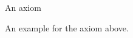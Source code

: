 \documentclass[minimal]{omdoc}
\begin{document}
\begin{module}[name=foo]
    \begin{axiom}[id=ax.one,title=A title]
      An axiom
    \end{axiom}

  \begin{example}[for=ax.one,title=A title]
    An example for the axiom above.
  \end{example}
\end{module}
\end{document}

